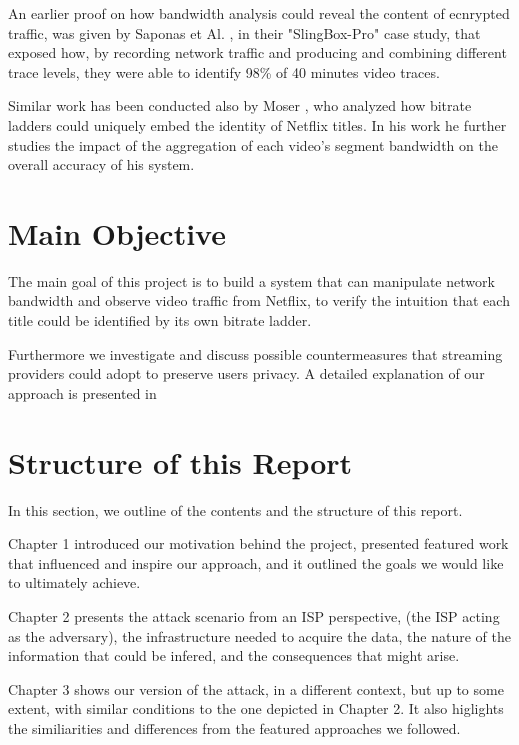 An earlier proof on how bandwidth analysis could reveal the content of
ecnrypted traffic, was given by Saponas et Al. \cite{Saponas2007devices}, in
their "SlingBox-Pro" case study, that exposed how, by recording network traffic
and producing and combining different trace levels, they were able to identify
98\% of 40 minutes video traces.

Similar work has been conducted also by Moser \cite{moser}, who analyzed how
bitrate ladders could uniquely embed the identity of Netflix titles. In his
work he further studies the impact of the aggregation of each video's segment
bandwidth on the overall accuracy of his system. 

\section{Main Objective}\label{sec:objective}

The main goal of this project is to build a system that can manipulate network
bandwidth and observe video traffic from Netflix, to verify the intuition that
each title could be identified by its own bitrate ladder. 

Furthermore we investigate and discuss possible countermeasures that streaming
providers could adopt to preserve users privacy. A detailed explanation of our
approach is presented in 

\section{Structure of this Report}\label{sec:structure}
  
In this section, we outline of the contents and the structure of this report.

Chapter 1 introduced our motivation behind the project, presented featured work
that influenced and inspire our approach, and it outlined the goals we would
like to ultimately achieve.

Chapter 2 presents the attack scenario from an ISP perspective, (the ISP acting
as the adversary), the infrastructure needed to acquire the data, the nature of
the information that could be infered, and the consequences that might arise.

Chapter 3 shows our version of the attack, in a different context, but up to
some extent, with similar conditions to the one depicted in Chapter 2. It also
higlights the similiarities and differences from the featured approaches we followed.

